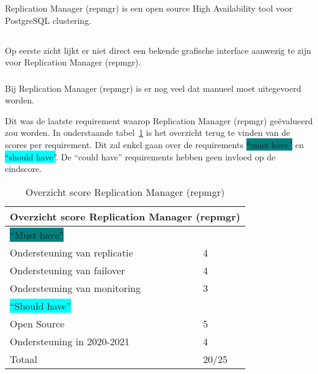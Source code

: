Replication Manager (repmgr) is een open source High Availability tool voor PostgreSQL clustering.

\subsection{}
\label{subsec:Could have}

\subsubsection{}
\label{subsubsec:Grafische interface}

Op eerste zicht lijkt er niet direct een bekende grafische interface aanwezig te zijn voor Replication Manager (repmgr).

\subsubsection{}
\label{subsubsec:Beperkte manuele interventie}

Bij Replication Manager (repmgr) is er nog veel dat manueel moet uitegevoerd worden.


Dit was de laatste requirement waarop Replication Manager (repmgr) geëvalueerd zou worden. In onderstaande tabel~\ref{table:Overzicht score Replication Manager (repmgr)} is het overzicht terug te vinden van de scores per requirement. Dit zal enkel gaan over de requirements \colorbox{teal}{“must have”} en \colorbox{cyan}{“should have”}. De “could have” requirements hebben geen invloed op de eindscore.

\begin{table}[!h]
    \centering
    \begin{tabular}{ |p{6cm}||p{6cm}|  }
        \hline
        \multicolumn{2}{|c|}{Overzicht score Replication Manager (repmgr)} \\
        \hline
        \colorbox{teal}{“Must have”} & \\
        \hline
        Ondersteuning van replicatie  & 4 \\
        Ondersteuning van failover &  4 \\
        Ondersteuning van monitoring & 3 \\
        \hline
        \colorbox{cyan}{“Should have”} & \\
        \hline
        Open Source &  5 \\
        Ondersteuning in 2020-2021 & 4 \\
        \hline
        \hline
        Totaal & 20/25 \\
        \hline
    \end{tabular}
    \caption{Overzicht score Replication Manager (repmgr)}
    \label{table:Overzicht score Replication Manager (repmgr)}
\end{table}